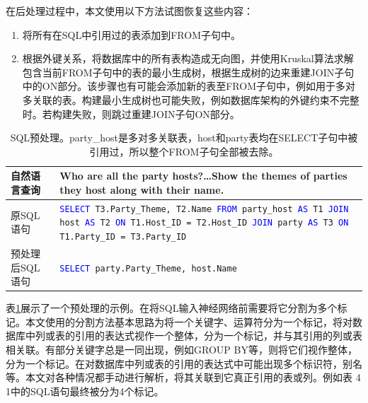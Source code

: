 在后处理过程中，本文使用以下方法试图恢复这些内容：
\begin{enumerate}
    \item 将所有在SQL中引用过的表添加到FROM子句中。
    \item 根据外键关系，将数据库中的所有表构造成无向图，并使用Kruskal算法求解包含当前FROM子句中的表的最小生成树，根据生成树的边来重建JOIN子句中的ON部分。该步骤也有可能会添加新的表至FROM子句中，例如用于多对多关联的表。构建最小生成树也可能失败，例如数据库架构的外键约束不完整时。若构建失败，则跳过重建JOIN子句ON部分。
\end{enumerate}

\begin{table}[]
    \def\sql#1{\texttt{#1}}
    \def\kw#1{\textcolor{blue}{#1}}
    \def\SELECT{\kw{SELECT }}
    \def\FROM{\kw{FROM }}
    \def\JOIN{\kw{JOIN }}
    \def\AS{\kw{AS }}
    \def\ON{\kw{ON }}

    \begin{tabularx}{\textwidth}{l|X}
    \hline
    自然语言查询 & Who are all the party hosts?…\newline Show the themes of parties they host along with their name.\\ \hline
    原SQL语句 &
    \sql{\SELECT T3.Party\_Theme, T2.Name \FROM party\_host \AS T1 \newline
        \-\hspace{2em} \JOIN host \AS T2 \ON T1.Host\_ID = T2.Host\_ID \newline
        \-\hspace{2em} \JOIN party \AS T3 \ON T1.Party\_ID = T3.Party\_ID} \\ \hline
    预处理后SQL语句 &
    \sql{\SELECT party.Party\_Theme, host.Name} \\ \hline
    \end{tabularx}
    \caption{SQL预处理。party\_host是多对多关联表，host和party表均在SELECT子句中被引用过，所以整个FROM子句全部被去除。}
    \label{preprocess-eg}
\end{table}

表\ref{preprocess-eg}展示了一个预处理的示例。在将SQL输入神经网络前需要将它分割为多个标记。本文使用的分割方法基本思路为将一个关键字、运算符分为一个标记，将对数据库中列或表的引用的表达式视作一个整体，分为一个标记，并与其引用的列或表相关联。有部分关键字总是一同出现，例如GROUP BY等，则将它们视作整体，分为一个标记。在对数据库中列或表的引用的表达式中可能出现多个标识符，别名等。本文对各种情况都手动进行解析，将其关联到它真正引用的表或列。例如表 4 1中的SQL语句最终被分为4个标记。

